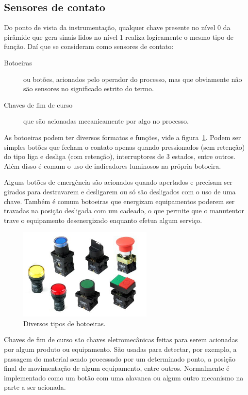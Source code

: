 \subsection{Sensores de contato}
Do ponto de vista da instrumentação, qualquer chave presente no nível 0 da pirâmide que gera sinais lidos no nível 1 realiza logicamente o mesmo tipo de função. Daí que se consideram como sensores de contato:
\begin{description}
  \item[Botoeiras] ou botões, acionados pelo operador do processo, mas que obviamente não são sensores no significado estrito do termo.
  \item[Chaves de fim de curso] que são acionadas mecanicamente por algo no processo.
\end{description}

As botoeiras podem ter diversos formatos e funções, vide a figura~\ref{fig:botoeiras}. Podem ser simples botões que fecham o contato apenas quando pressionados (sem retenção) do tipo liga e desliga (com retenção), interruptores de 3 estados, entre outros. Além disso é comum o uso de indicadores luminosos na própria botoeira.

Alguns botões de emergência são acionados quando apertados e precisam ser girados para destravarem e desligarem ou só são desligados com o uso de uma chave. Também é comum botoeiras que energizam equipamentos poderem ser travadas na posição desligada com um cadeado, o que permite que o manutentor trave o equipamento desenergizado enquanto efetua algum serviço.

\begin{figure}
  \centering
  \includegraphics[width=0.6\textwidth]{figuras/botoeiras}
  \caption{Diversos tipos de botoeiras.}\label{fig:botoeiras}
\end{figure}

Chaves de fim de curso são chaves eletromecânicas feitas para serem acionadas por algum produto ou equipamento. São usadas para detectar, por exemplo, a passagem do material sendo processado por um determinado ponto, a posição final de movimentação de algum equipamento, entre outros. Normalmente é implementado como um botão com uma alavanca ou algum outro mecanismo na parte a ser acionada.

